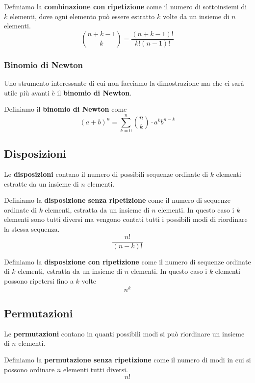\begin{definition}
	Definiamo la \textbf{combinazione con ripetizione} come il numero di sottoinsiemi di $k$
	elementi, dove ogni elemento può essere estratto $k$ volte da un insieme di $n$ elementi.
	\[ \binom{n+k-1}{k} = \frac{(n + k - 1)!}{k! (n-1)!} \]
\end{definition}

\subsubsection{Binomio di Newton}
Uno strumento interessante di cui non facciamo la dimostrazione ma che ci sarà utile più avanti è
il \textbf{binomio di Newton}.

\begin{definition}
	Definiamo il \textbf{binomio di Newton} come
	\[ (a + b)^n = \sum_{k=0}^n \binom{n}{k} \cdot a^k b^{n-k} \]
\end{definition}

\subsection{Disposizioni}
Le \textbf{disposizioni} contano il numero di possibili sequenze ordinate di $k$ elementi estratte
da un insieme di $n$ elementi.

\begin{definition}
	Definiamo la \textbf{disposizione senza ripetizione} come il numero di sequenze ordinate di $k$
	elementi, estratta da un insieme di $n$ elementi. In questo caso i $k$ elementi sono tutti
	diversi ma vengono contati tutti i possibili modi di riordinare la stessa sequenza.
	\[ \frac{n!}{(n - k)!} \]
\end{definition}

\begin{definition}
	Definiamo la \textbf{disposizione con ripetizione} come il numero di sequenze ordinate di $k$
	elementi, estratta da un insieme di $n$ elementi. In questo caso i $k$ elementi possono
	ripetersi fino a $k$ volte
	\[ n^k \]
\end{definition}

\subsection{Permutazioni}
Le \textbf{permutazioni} contano in quanti possibili modi si può riordinare un insieme di $n$
elementi.

\begin{definition}
	Definiamo la \textbf{permutazione senza ripetizione} come il numero di modi in cui si possono
	ordinare $n$ elementi tutti diversi.
	\[ n! \]
\end{definition}

